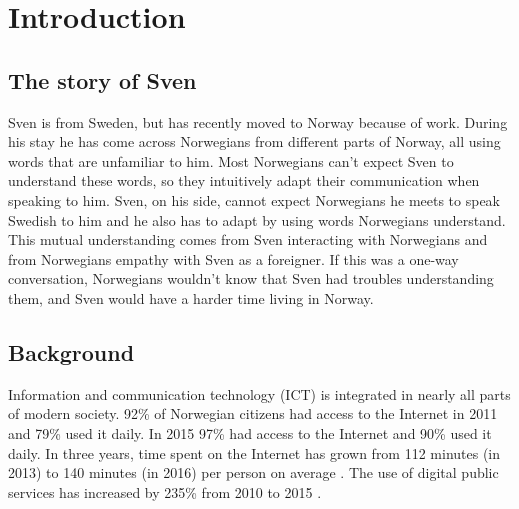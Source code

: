 
\chapter{Introduction}


\section{The story of Sven}
Sven is from Sweden, but has recently moved to Norway because of work. During his stay he has come across Norwegians from different parts of Norway, all using words that are unfamiliar to him. Most Norwegians can't expect Sven to understand these words, so they intuitively adapt their communication when speaking to him. Sven, on his side, cannot expect Norwegians he meets to speak Swedish to him and he also has to adapt by using words Norwegians understand. This mutual understanding comes from Sven interacting with Norwegians and from Norwegians empathy with Sven as a foreigner. If this was a one-way conversation, Norwegians wouldn't know that Sven had troubles understanding them, and Sven would have a harder time living in Norway.

\section{Background}

Information and communication technology (ICT) is integrated in nearly all parts of modern society. 
92\% of Norwegian citizens had access to the Internet in 2011 and 79\% used it daily. In 2015 97\% had access to the Internet and 90\% used it daily. In three years, time spent on the Internet has grown from 112 minutes (in 2013) to 140 minutes (in 2016) per person on average \parencite{ssb_tid_2017}. The use of digital public services has increased by 235\% from 2010 to 2015 \parencite{Moderniseringsdepartementet2016}. 

